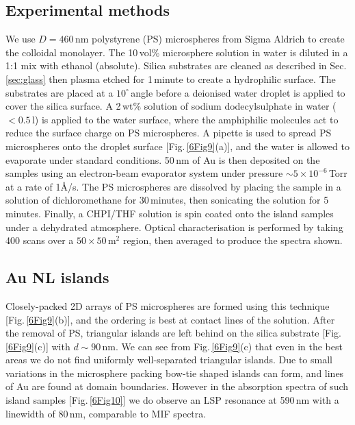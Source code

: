 \subsection{Experimental methods}
We use $D=460$\,nm polystyrene (PS) microspheres from Sigma Aldrich to create the colloidal monolayer. The 10\,vol\% microsphere solution in water is diluted in a 1:1 mix with ethanol (absolute). Silica substrates are cleaned as described in Sec.\,\ref{sec:glass} then plasma etched for 1\,minute to create a hydrophilic surface. The substrates are placed at a $10^{\circ}$\,angle before a deionised water droplet is applied to cover the silica surface. A 2\,wt\% solution of sodium dodecylsulphate in water ($<0.5\,$\textmu l) is applied to the water surface, where the amphiphilic molecules act to reduce the surface charge on PS microspheres. A pipette is used to spread PS microspheres onto the droplet surface [Fig.\,\ref{6Fig9}(a)], and the water is allowed to evaporate under standard conditions. 50\,nm of Au is then deposited on the samples using an electron-beam evaporator system under pressure $\sim5\times10^{-6}$\,Torr at a rate of 1\AA/s. The PS microspheres are dissolved by placing the sample in a solution of dichloromethane for 30\,minutes, then sonicating the solution for 5\,minutes. Finally, a CHPI/THF solution is spin coated onto the island samples under a dehydrated atmosphere. Optical characterisation is performed by taking 400 scans over a $50\times50\,$\textmu m$^{2}$ region, then averaged to produce the spectra shown. 

\subsection{Au NL islands}
Closely-packed 2D arrays of PS microspheres are formed using this technique [Fig.\,\ref{6Fig9}(b)], and the ordering is best at contact lines of the solution. After the removal of PS, triangular islands are left behind on the silica substrate [Fig.\,\ref{6Fig9}(c)] with $d\sim90$\,nm. We can see from Fig.\,\ref{6Fig9}(c) that even in the best areas we do not find uniformly well-separated triangular islands. Due to small variations in the microsphere packing bow-tie shaped islands can form, and lines of Au are found at domain boundaries. However in the absorption spectra of such island samples [Fig.\,\ref{6Fig10}] we do observe an LSP resonance at 590\,nm with a linewidth of 80\,nm, comparable to MIF spectra.

